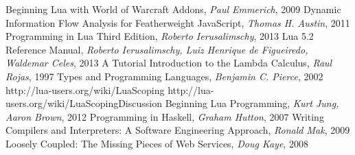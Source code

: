 \begin{thebibliography}{10}

 Beginning Lua with World of Warcraft Addons, {\it Paul Emmerich}, 2009
 Dynamic Information Flow Analysis for Featherweight JavaScript, {\it Thomas H. Austin}, 2011
 Programming in Lua Third Edition, {\it  Roberto Ierusalimschy}, 2013
 Lua 5.2 Reference Manual, {\it Roberto Ierusalimschy, Luiz Henrique de Figueiredo, Waldemar Celes}, 2013
 A Tutorial Introduction to the Lambda Calculus, {\it Raul Rojas}, 1997
 Types and Programming Languages, {\it Benjamin C. Pierce}, 2002
 http://lua-users.org/wiki/LuaScoping
 http://lua-users.org/wiki/LuaScopingDiscussion
 Beginning Lua Programming, {\it Kurt Jung, Aaron Brown}, 2012
 Programming in Haskell, {\it Graham Hutton}, 2007
 Writing Compilers and Interpreters: A Software Engineering Approach, {\it Ronald Mak}, 2009
 Loosely Coupled: The Missing Pieces of Web Services, {\it Doug Kaye}, 2008
\\

\end{thebibliography}
